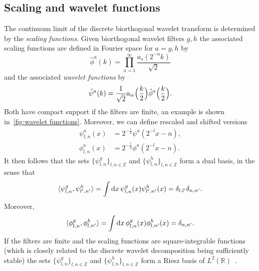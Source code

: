 \documentclass[submission, Phys]{SciPost}
\theoremstyle{definition}
\theoremstyle{remark}
\DeclarePairedDelimiter{\braket}{\langle}{\rangle}
\newcommand{\ZZ}{\mathbb Z}
\newcommand{\RR}{\mathbb R}
\renewcommand{\d}{\ensuremath{\mathrm{d}}}
\begin{document}
\subsection{Scaling and wavelet functions}
The continuum limit of the discrete biorthogonal wavelet transform is determined by the \emph{scaling functions}.
Given biorthogonal wavelet filters $g,h$ the associated scaling functions are defined in Fourier space for $a = g,h$ by
\begin{equation}\label{eq:scaling function}
  \hat{\phi}^a(k) = \prod_{n=1}^{\infty}\frac{a_s(2^{-n}k)}{\sqrt2}
\end{equation}
and the associated \emph{wavelet functions} by
\begin{equation}\label{eq:wavelet function}
  \hat{\psi}^a(k) = \frac{1}{\sqrt2} a_w\Bigl(\frac{k}{2}\Bigr)\hat{\phi}^a\Bigl(\frac{k}{2}\Bigr).
\end{equation}
Both have compact support if the filters are finite, an example is shown in~\cref{fig:wavelet functions}.
Moreover, we can define rescaled and shifted versions
\begin{equation*}\begin{aligned}
  \psi^a_{l,n}(x) &= 2^{-\frac{l}{2}}\psi^a(2^{-l}x - n),\\
  \phi^a_{l,n}(x) &= 2^{-\frac{l}{2}}\phi^a(2^{-l}x - n).
\end{aligned}\end{equation*}
It then follows that the sets $\{\psi^g_{l,n}\}_{l,n \in \ZZ}$ and $\{\psi^h_{l,n}\}_{l,n \in \ZZ}$ form a dual basis, in the sense that
\begin{equation*}
  \braket{\psi^g_{l,n}, \psi^h_{l',n'}} = \int \d x \, \psi^g_{l,n}(x)\psi^h_{l',n'}(x) = \delta_{l,l'}\delta_{n,n'}.
\end{equation*}
Moreover,
\begin{equation*}
  \braket{\phi^g_{l,n}, \phi^h_{l,n'}} = \int \d x \, \phi^g_{l,n}(x)\phi^h_{l,n'}(x) = \delta_{n,n'}.
\end{equation*}
If the filters are finite and the scaling functions are square-integrable functions (which is closely related to the discrete wavelet decomposition being sufficiently stable) the sets $\{\psi^g_{l,n}\}_{l,n \in \ZZ}$ and $\{\psi^h_{l,n}\}_{l,n \in \ZZ}$ form a Riesz basis of $L^2(\RR)$~\cite{cohen1992biorthogonal}.
\end{document}
